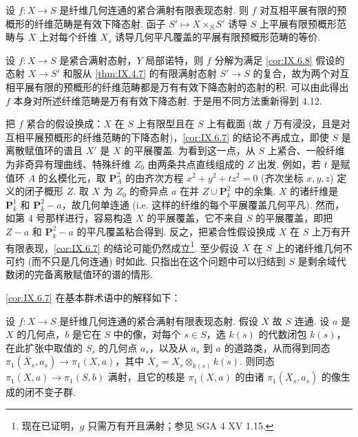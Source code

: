 \begin{corollary}\label{cor:IX.6.8}
设 $f \colon X \to S$ 是纤维几何连通的紧合满射有限表现态射. 则 $f$ 对互相平展有限的预概形的纤维范畴是有效下降态射. 函子 $S' \mapsto X \times_S S'$ 诱导 $S$ 上平展有限预概形范畴与 $X$ 上对每个纤维 $X_s$ 诱导几何平凡覆盖的平展有限预概形范畴的等价.
\end{corollary}

\begin{remark}\label{rem:IX.6.9}
设 $f \colon X \to S$ 是紧合满射态射，$Y$ 局部诺特，则 $f$ 分解为满足 \ref{cor:IX.6.8} 假设的态射 $X \to S'$ 和服从 \ref{thm:IX.4.7} 的有限满射态射 $S' \to S$ 的复合，故为两个对互相平展有限的预概形的纤维范畴都是万有有效下降态射的态射的积. 可以由此得出 $f$ 本身对所述纤维范畴是万有有效下降态射. 于是用不同方法重新得到 4.12.
\end{remark}

\begin{remark}\label{rem:IX.6.10}
把 $f$ 紧合的假设换成：$X$ 在 $S$ 上有限型且在 $S$ 上有截面 (故 $f$ 万有浸没，且是对互相平展预概形的纤维范畴的下降态射)，\ref{cor:IX.6.7} 的结论不再成立，即使 $S$ 是离散赋值环的谱且 $X'$ 是 $X$ 的平展覆盖. 为看到这一点，从 $S$ 上紧合、一般纤维为非奇异有理曲线、特殊纤维 $Z_0$ 由两条共点直线组成的 $Z$ 出发. 例如，若 $t$ 是赋值环 $A$ 的幺模化元，取 $\mathbf{P}^2_A$ 的由齐次方程 $x^2 + y^2 + tz^2 = 0$ (齐次坐标 $x, y, z$) 定义的闭子概形 $Z$. 取 $X$ 为 $Z_0$ 的奇异点 $a$ 在并 $Z \cup \mathbf{P}^2_k$ 中的余集. $X$ 的诸纤维是 $\mathbf{P}^1_k$ 和 $\mathbf{P}^2_k - a$，故几何单连通 (i.e. 这样的纤维的每个平展覆盖几何平凡). 然而，如第 4 号那样进行，容易构造 $X$ 的平展覆盖，它不来自 $S$ 的平展覆盖，即把 $Z - a$ 和 $\mathbf{P}^2_k - a$ 的平凡覆盖粘合得到. 反之，把紧合性假设换成 $X$ 在 $S$ 上万有开有限表现，\ref{cor:IX.6.7} 的结论可能仍然成立\footnote{现在已证明，$g$ 只需万有开且满射；参见 SGA 4 XV 1.15.}. 至少假设 $X$ 在 $S$ 上的诸纤维几何不可约 (而不只是几何连通) 时如此. 只指出在这个问题中可以归结到 $S$ 是剩余域代数闭的完备离散赋值环的谱的情形.
\end{remark}

\ref{cor:IX.6.7} 在基本群术语中的解释如下：

\begin{corollary}\label{cor:IX.6.11}
设 $f \colon X \to S$ 是纤维几何连通的紧合满射有限表现态射. 假设 $X$ 故 $S$ 连通. 设 $a$ 是 $X$ 的几何点，$b$ 是它在 $S$ 中的像，对每个 $s \in S$，选 $k(s)$ 的代数闭包 $\overline{k(s)}$，在此扩张中取值的 $S_s$ 的几何点 $a_s$，以及从 $a_s$ 到 $a$ 的道路类，从而得到同态 $\pi_1(\overline{X}_s, a_s) \to \pi_1(X, a)$，其中 $\overline{X}_s = X_s \otimes_{k(s)} \overline{k(s)}$. 则同态 $\pi_1(X, a) \to \pi_1(S, b)$ 满射，且它的核是 $\pi_1(X, a)$ 的由诸 $\pi_1(\overline{X}_s, a_s)$ 的像生成的闭不变子群.
\end{corollary}


